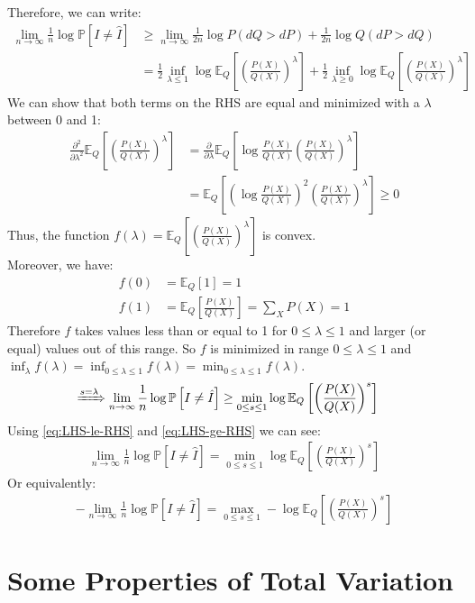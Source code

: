 \documentclass{article}
\numberwithin{equation}{section}
\newcommand{\EX}[2][]{\mathbb{E}_{#1}\left[#2\right]}%
\newcommand{\prob}[1]{\mathbb{P}\left[#1\right]}%
\begin{document}
Therefore, we can write:
\begin{align}
\lim_{n \to \infty}\frac{1}{n} \log \prob{I \neq \hat{I}} &\ge \lim_{n \to \infty} \frac{1}{2n} \log P(dQ > dP) + \frac{1}{2n} \log Q(dP > dQ)\\
&= \frac{1}{2} \inf_{\lambda \le 1} \log \EX[Q]{\left(\frac{P(X)}{Q(X)}\right)^{\lambda}} + \frac{1}{2} \inf_{\lambda \ge 0} \log \EX[Q]{\left(\frac{P(X)}{Q(X)}\right)^{\lambda}}
\end{align}
We can show that both terms on the RHS are equal and minimized with a \(\lambda\) between 0 and 1:
\begin{align}
\frac{\partial^2}{\partial \lambda^2} \EX[Q]{\left(\frac{P(X)}{Q(X)}\right)^{\lambda}} &= \frac{\partial}{\partial \lambda} \EX[Q]{\log\frac{P(X)}{Q(X)}\left(\frac{P(X)}{Q(X)}\right)^{\lambda}}\\
&=\EX[Q]{\left(\log\frac{P(X)}{Q(X)}\right)^2\left(\frac{P(X)}{Q(X)}\right)^{\lambda}} \ge 0
\end{align}
Thus, the function \(f(\lambda) = \EX[Q]{\left(\frac{P(X)}{Q(X)}\right)^{\lambda}}\) is convex.\\
Moreover, we have:
\begin{align}
f(0) &= \EX[Q]{1} = 1\\
f(1) &= \EX[Q]{\frac{P(X)}{Q(X)}} = \sum_X P(X) = 1
\end{align}
Therefore \(f\) takes values less than or equal to 1 for \(0\le \lambda \le 1\) and larger (or equal) values out of this range.
So \(f\) is minimized in range \(0\le \lambda \le 1\) and \(\inf_{\lambda} f(\lambda) = \inf_{0\le \lambda \le 1} f(\lambda) = \min_{0\le \lambda \le 1} f(\lambda)\).
\begin{align}
\xRightarrow{s = \lambda} \lim_{n \to \infty}\frac{1}{n} \log \prob{I \neq \hat{I}} &\ge \min_{0\le s \le 1} \log \EX[Q]{\left(\frac{P(X)}{Q(X)}\right)^{s}}
\label{eq:LHS-ge-RHS}
\end{align}
Using \eqref{eq:LHS-le-RHS} and \eqref{eq:LHS-ge-RHS} we can see:
\begin{align}
    \lim_{n \to \infty}\frac{1}{n} \log \prob{I \neq \hat{I}} = \min_{0\le s \le 1} \log \EX[Q]{\left(\frac{P(X)}{Q(X)}\right)^{s}}
\end{align}
Or equivalently:
\begin{align}
    -\lim_{n \to \infty}\frac{1}{n} \log \prob{I \neq \hat{I}} = \max_{0\le s \le 1} -\log \EX[Q]{\left(\frac{P(X)}{Q(X)}\right)^{s}}
\end{align}

\section{Some Properties of Total Variation}
\end{document}
